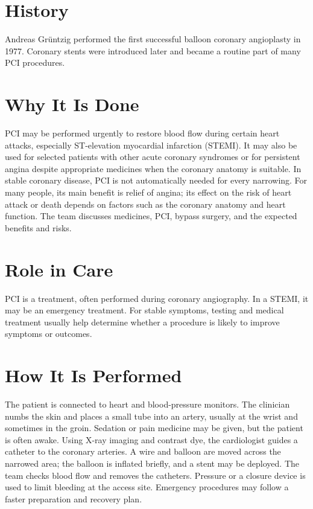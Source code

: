 \section*{History}
Andreas Grüntzig performed the first successful balloon coronary angioplasty in 1977. Coronary stents were introduced later and became a routine part of many PCI procedures.

\section*{Why It Is Done}
PCI may be performed urgently to restore blood flow during certain heart attacks, especially ST-elevation myocardial infarction (STEMI). It may also be used for selected patients with other acute coronary syndromes or for persistent angina despite appropriate medicines when the coronary anatomy is suitable. In stable coronary disease, PCI is not automatically needed for every narrowing. For many people, its main benefit is relief of angina; its effect on the risk of heart attack or death depends on factors such as the coronary anatomy and heart function. The team discusses medicines, PCI, bypass surgery, and the expected benefits and risks.

\section*{Role in Care}
PCI is a treatment, often performed during coronary angiography. In a STEMI, it may be an emergency treatment. For stable symptoms, testing and medical treatment usually help determine whether a procedure is likely to improve symptoms or outcomes.

\section*{How It Is Performed}
The patient is connected to heart and blood-pressure monitors. The clinician numbs the skin and places a small tube into an artery, usually at the wrist and sometimes in the groin. Sedation or pain medicine may be given, but the patient is often awake. Using X-ray imaging and contrast dye, the cardiologist guides a catheter to the coronary arteries. A wire and balloon are moved across the narrowed area; the balloon is inflated briefly, and a stent may be deployed. The team checks blood flow and removes the catheters. Pressure or a closure device is used to limit bleeding at the access site. Emergency procedures may follow a faster preparation and recovery plan.

